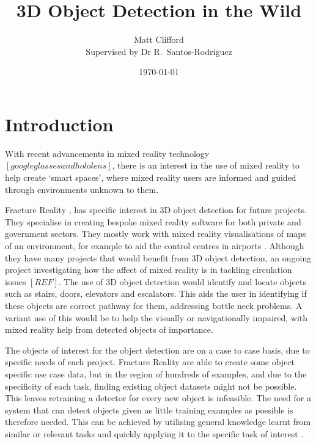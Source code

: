 \documentclass[11pt]{article}
\title{3D Object Detection in the Wild}
\author{Matt Clifford \\ Supervised by Dr R.\ Santos-Rodriguez}
\date{\today}
\begin{document}
\maketitle

\section{Introduction}
With recent advancements in mixed reality technology $[googleglasses and hololens]$, there is an interest in the use of mixed reality to help create `smart spaces', where mixed reality users are informed and guided through environments unknown to them.

Fracture Reality \cite{fracture}, has specific interest in 3D object detection for future projects. They specialise in creating bespoke mixed reality software for both private and government sectors. They mostly work with mixed reality visualisations of maps of an environment, for example to aid the control centres in airports \cite{youtube}. Although they have many projects that would benefit from 3D object detection, an ongoing project investigating how the affect of mixed reality is in tackling circulation issues $[REF]$. The use of 3D object detection would identify and locate objects such as stairs, doors, elevators and escalators. This aids the user in identifying if these objects are correct pathway for them, addressing bottle neck problems. A variant use of this would be to help the visually or navigationally impaired, with mixed reality help from detected objects of importance.

The objects of interest for the object detection are on a case to case basis, due to specific needs of each project. Fracture Reality are able to create some object specific use case data, but in the region of hundreds of examples, and due to the specificity of each task, finding existing object datasets might not be possible. This leaves retraining a detector for every new object is infeasible. The need for a system that can detect objects given as little training examples as possible is therefore needed. This can be achieved by utilising general knowledge learnt from similar or relevant tasks and quickly applying it to the specific task of interest \cite{DeCAF}.
\end{document}
